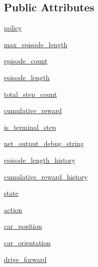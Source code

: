 \subsection*{Public Attributes}
\begin{DoxyCompactItemize}
\item 
\hyperlink{classtraining__node_1_1_training_node_afcfa3e299101c9795ea29b425e12ffab}{policy}
\item 
\hyperlink{classtraining__node_1_1_training_node_a5d1780473359a3b1fd3ca9ec5a1fa5e1}{max\+\_\+episode\+\_\+length}
\item 
\hyperlink{classtraining__node_1_1_training_node_a1f1839691d11a27b01271e1e4eda934f}{episode\+\_\+count}
\item 
\hyperlink{classtraining__node_1_1_training_node_a79246dff36d3d3b28fe80923938dd8a1}{episode\+\_\+length}
\item 
\hyperlink{classtraining__node_1_1_training_node_a3a5dfc28c6625a91f18ca7f8ddfbb8e6}{total\+\_\+step\+\_\+count}
\item 
\hyperlink{classtraining__node_1_1_training_node_a1c132944727873d2f9449228f3845889}{cumulative\+\_\+reward}
\item 
\hyperlink{classtraining__node_1_1_training_node_aa30ad32e868062b9e6eeccc27ad41bdd}{is\+\_\+terminal\+\_\+step}
\item 
\hyperlink{classtraining__node_1_1_training_node_a9aa59ff1a63634d0305faf83b43092c9}{net\+\_\+output\+\_\+debug\+\_\+string}
\item 
\hyperlink{classtraining__node_1_1_training_node_aa2a3575522157d4d29ff2d22c8909037}{episode\+\_\+length\+\_\+history}
\item 
\hyperlink{classtraining__node_1_1_training_node_a458671c2da220b55b62284b0bb0a2916}{cumulative\+\_\+reward\+\_\+history}
\item 
\hyperlink{classtraining__node_1_1_training_node_ab3ec26c96f6e4d86cd0be251d4fd1af4}{state}
\item 
\hyperlink{classtraining__node_1_1_training_node_a9aca91d2739de83e292f046f6047c193}{action}
\item 
\hyperlink{classtraining__node_1_1_training_node_ac89f63234a29b8591b0dc11f31c08b46}{car\+\_\+position}
\item 
\hyperlink{classtraining__node_1_1_training_node_aea2d9421fd831521afbfa48a1debb27c}{car\+\_\+orientation}
\item 
\hyperlink{classtraining__node_1_1_training_node_af53c5a749db204b5101fc583ef09c85e}{drive\+\_\+forward}
\item 

\end{DoxyCompactItemize}
